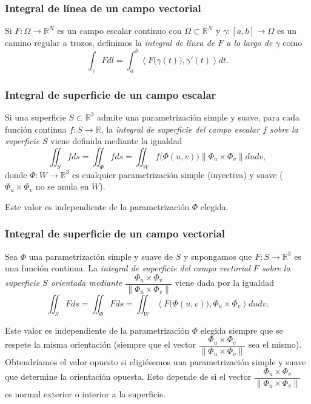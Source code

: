 \documentclass[12pt,spanish]{article}
\theoremstyle{definition}
\theoremstyle{remark}
\begin{document}
\subsubsection*{Integral de línea de un campo vectorial}

Si $F:\Omega\rightarrow\mathbb{R}^N$ es un campo escalar continuo con $\Omega\subset\mathbb{R}^N$ y $\gamma:[a,b]\rightarrow\Omega$ es un camino regular a trozos, definimos la \emph{integral de línea de $F$ a lo largo de $\gamma$} como
\[\int_\gamma F dl=\int_a^b \left\langle F\big(\gamma(t)\big),\gamma'(t)\right\rangle dt.\]

\subsubsection*{Integral de superficie de un campo escalar}

Si una superficie $S\subset \mathbb{R}^3$ admite una parametrización simple y suave, para cada función continua $f:S\rightarrow\mathbb{R}$, la \emph{integral de superficie del campo escalar $f$ sobre la superficie $S$} viene definida mediante la igualdad
\[\iint_S f ds=\iint_\Phi f ds=\iint_W f\big(\Phi(u,v)\big)\|\Phi_u\times \Phi_v\| du dv,\]
donde $\Phi:W\rightarrow\mathbb{R}^3$ es cualquier parametrización simple (inyectiva) y suave ($\Phi_u\times \Phi_v$ no se anula en $W$).

Este valor es independiente de la parametrización $\Phi$ elegida.

\subsubsection*{Integral de superficie de un campo vectorial}

Sea $\Phi$ una parametrización simple y suave de $S$ y supongamos que $F:S\rightarrow\mathbb{R}^3$ es una función continua. La \emph{integral de superficie del campo vectorial $F$ sobre la superficie $S$ orientada mediante $\dfrac{\Phi_u\times \Phi_v}{\|\Phi_u\times \Phi_v\|}$} viene dada por la igualdad
\[\iint_S F ds=\iint_\Phi F ds=\iint_W \left\langle F\big(\Phi(u,v)\big), \Phi_u\times \Phi_v\right\rangle du dv.\]

Este valor es independiente de la parametrización $\Phi$ elegida siempre que se respete la misma orientación \Big(siempre que el vector $\dfrac{\Phi_u\times \Phi_v}{\|\Phi_u\times \Phi_v\|}$ sea el mismo\Big). Obtendríamos el valor opuesto si eligiésemos una parametrización simple y suave que determine la orientación opuesta. Esto depende de si el vector $\dfrac{\Phi_u\times \Phi_v}{\|\Phi_u\times \Phi_v\|}$ es normal exterior o interior a la superficie.
\end{document}
